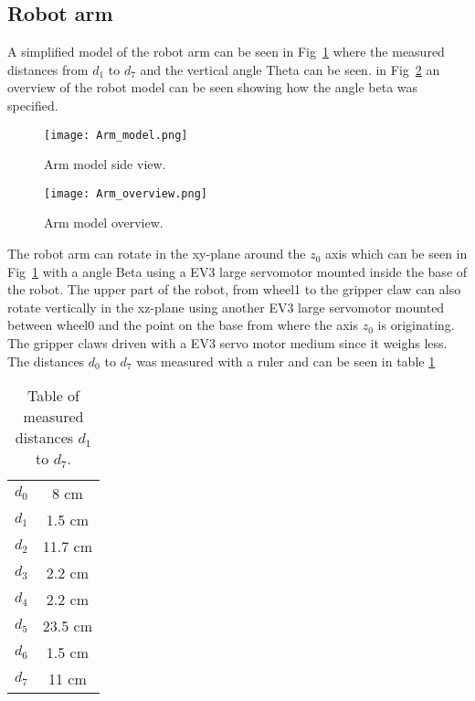 \subsection{Robot arm}
A simplified model of the robot arm can be seen in Fig~\ref{Arm_model} where the measured distances from \(d_1\) to \(d_7\) and the vertical angle Theta can be seen. in Fig~\ref{arm_overview} an overview of the robot model can be seen showing how the angle beta was specified.
\begin{figure}[H]
    \centering
    \texttt{[image: Arm\_model.png]}
    \caption{Arm model side view.}
    \label{Arm_model}
\end{figure}
\begin{figure}[H]
    \centering
    \texttt{[image: Arm\_overview.png]}
    \caption{Arm model overview.}
    \label{arm_overview}
\end{figure}
The robot arm can rotate in the xy-plane around the \(z_0\) axis which can be seen in Fig~\ref{Arm_model} with a angle Beta using a EV3 large servomotor mounted inside the base of the robot. The upper part of the robot, from wheel1 to the gripper claw can also rotate vertically in the xz-plane using another EV3 large servomotor mounted between wheel0 and the point on the base from where the axis \(z_0\) is originating. The gripper claws  driven with a EV3 servo motor medium since it weighs less. The distances \(d_0\) to \(d_7\) was measured with a ruler and can be seen in table \ref{Tab:distance_table}
\begin{table}[H]
\begin{center}
\begin{tabular}{ |c|c| } 
 \hline
 \(d_0\) & 8 cm  \\ 
 \(d_1\) & 1.5 cm  \\ 
 \(d_2\) & 11.7 cm  \\
 \(d_3\) & 2.2 cm\\
 \(d_4\) & 2.2 cm\\
 \(d_5\) & 23.5 cm\\
 \(d_6\) & 1.5 cm\\
 \(d_7\) & 11 cm \\
 \hline
\end{tabular}
\end{center}
\caption{Table of measured distances \(d_1\) to \(d_7\).}
\label{Tab:distance_table}
\end{table}
